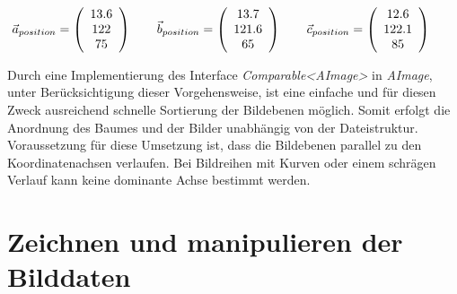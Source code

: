 \begin{equation}
\vec{a}_{position}=\left(\begin{array}{c} 13.6 \\ 122 \\ 75 \end{array}\right) \qquad
\vec{b}_{position}=\left(\begin{array}{c} 13.7 \\ 121.6 \\ 65 \end{array}\right) \qquad
\vec{c}_{position}=\left(\begin{array}{c} 12.6 \\ 122.1 \\ 85 \end{array}\right) \qquad
\vspace{0.5cm}
\label{example_sort}
\end{equation}

Durch eine Implementierung des Interface \textit{Comparable\textless AImage\textgreater} in \textit{AImage}, unter Berücksichtigung dieser Vorgehensweise, ist eine einfache und für diesen Zweck ausreichend schnelle Sortierung der Bildebenen möglich. Somit erfolgt die Anordnung des Baumes und der Bilder unabhängig von der Dateistruktur.\\
Voraussetzung für diese Umsetzung ist, dass die Bildebenen parallel zu den Koordinatenachsen verlaufen. Bei Bildreihen mit Kurven oder einem schrägen Verlauf kann keine dominante Achse bestimmt werden.

\FloatBarrier
\section{Zeichnen und manipulieren der Bilddaten} \label{drawandmanipulate}

